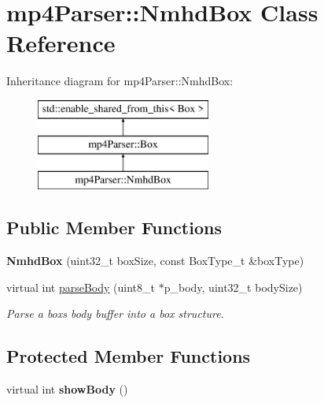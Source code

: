 \hypertarget{classmp4_parser_1_1_nmhd_box}{}\section{mp4\+Parser\+::Nmhd\+Box Class Reference}
\label{classmp4_parser_1_1_nmhd_box}
Inheritance diagram for mp4\+Parser\+::Nmhd\+Box\+:\begin{figure}[H]
\begin{center}
\leavevmode
\includegraphics[height=3.000000cm]{classmp4_parser_1_1_nmhd_box}
\end{center}
\end{figure}
\subsection*{Public Member Functions}
\begin{DoxyCompactItemize}
\item 
\mbox{\label{classmp4_parser_1_1_nmhd_box_a411976bc61841a7d2f3e650b4d7f6f27}} 
{\bfseries Nmhd\+Box} (uint32\+\_\+t box\+Size, const Box\+Type\+\_\+t \&box\+Type)
\item 
virtual int \mbox{\hyperlink{classmp4_parser_1_1_nmhd_box_a958b5d3192ea2ac972c5f6f71c7cd6cc}{parse\+Body}} (uint8\+\_\+t $\ast$p\+\_\+body, uint32\+\_\+t body\+Size)
\begin{DoxyCompactList}\small\item\em Parse a box\textquotesingle{}s body buffer into a box structure. \end{DoxyCompactList}\end{DoxyCompactItemize}
\subsection*{Protected Member Functions}
\begin{DoxyCompactItemize}
\item 
\mbox{\label{classmp4_parser_1_1_nmhd_box_a022e87d2d6cf5a5979b898abd0fd8047}} 
virtual int {\bfseries show\+Body} ()
\end{DoxyCompactItemize}
